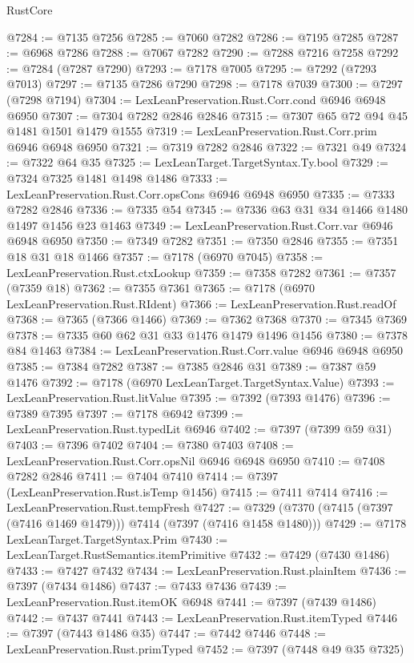 \begin{lexlean}{RustCore}
\begin{coremodule}
@7284 := @7135 @7256
@7285 := @7060 @7282
@7286 := @7195 @7285
@7287 := @6968 @7286
@7288 := @7067 @7282
@7290 := @7288 @7216 @7258
@7292 := @7284 (@7287 @7290)
@7293 := @7178 @7005
@7295 := @7292 (@7293 @7013)
@7297 := @7135 @7286 @7290
@7298 := @7178 @7039
@7300 := @7297 (@7298 @7194)
@7304 := LexLeanPreservation.Rust.Corr.cond @6946 @6948 @6950
@7307 := @7304 @7282 @2846 @2846
@7315 := @7307 @65 @72 @94 @45 @1481 @1501 @1479 @1555
@7319 := LexLeanPreservation.Rust.Corr.prim @6946 @6948 @6950
@7321 := @7319 @7282 @2846
@7322 := @7321 @49
@7324 := @7322 @64 @35
@7325 := LexLeanTarget.TargetSyntax.Ty.bool
@7329 := @7324 @7325 @1481 @1498 @1486
@7333 := LexLeanPreservation.Rust.Corr.opsCons @6946 @6948 @6950
@7335 := @7333 @7282 @2846
@7336 := @7335 @54
@7345 := @7336 @63 @31 @34 @1466 @1480 @1497 @1456 @23 @1463
@7349 := LexLeanPreservation.Rust.Corr.var @6946 @6948 @6950
@7350 := @7349 @7282
@7351 := @7350 @2846
@7355 := @7351 @18 @31 @18 @1466
@7357 := @7178 (@6970 @7045)
@7358 := LexLeanPreservation.Rust.ctxLookup
@7359 := @7358 @7282
@7361 := @7357 (@7359 @18)
@7362 := @7355 @7361
@7365 := @7178 (@6970 LexLeanPreservation.Rust.RIdent)
@7366 := LexLeanPreservation.Rust.readOf
@7368 := @7365 (@7366 @1466)
@7369 := @7362 @7368
@7370 := @7345 @7369
@7378 := @7335 @60 @62 @31 @33 @1476 @1479 @1496 @1456
@7380 := @7378 @84 @1463
@7384 := LexLeanPreservation.Rust.Corr.value @6946 @6948 @6950
@7385 := @7384 @7282
@7387 := @7385 @2846 @31
@7389 := @7387 @59 @1476
@7392 := @7178 (@6970 LexLeanTarget.TargetSyntax.Value)
@7393 := LexLeanPreservation.Rust.litValue
@7395 := @7392 (@7393 @1476)
@7396 := @7389 @7395
@7397 := @7178 @6942
@7399 := LexLeanPreservation.Rust.typedLit @6946
@7402 := @7397 (@7399 @59 @31)
@7403 := @7396 @7402
@7404 := @7380 @7403
@7408 := LexLeanPreservation.Rust.Corr.opsNil @6946 @6948 @6950
@7410 := @7408 @7282 @2846
@7411 := @7404 @7410
@7414 := @7397 (LexLeanPreservation.Rust.isTemp @1456)
@7415 := @7411 @7414
@7416 := LexLeanPreservation.Rust.tempFresh
@7427 := @7329 (@7370 (@7415 (@7397 (@7416 @1469 @1479))) @7414 (@7397 (@7416 @1458 @1480)))
@7429 := @7178 LexLeanTarget.TargetSyntax.Prim
@7430 := LexLeanTarget.RustSemantics.itemPrimitive
@7432 := @7429 (@7430 @1486)
@7433 := @7427 @7432
@7434 := LexLeanPreservation.Rust.plainItem
@7436 := @7397 (@7434 @1486)
@7437 := @7433 @7436
@7439 := LexLeanPreservation.Rust.itemOK @6948
@7441 := @7397 (@7439 @1486)
@7442 := @7437 @7441
@7443 := LexLeanPreservation.Rust.itemTyped
@7446 := @7397 (@7443 @1486 @35)
@7447 := @7442 @7446
@7448 := LexLeanPreservation.Rust.primTyped
@7452 := @7397 (@7448 @49 @35 @7325)

\end{coremodule}
\end{lexlean}

